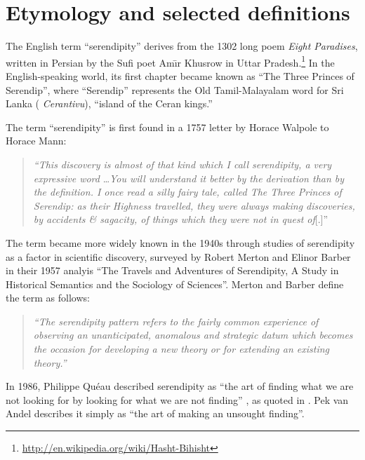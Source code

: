 
\section{Etymology and selected definitions} \label{sec:overview-serendipity}  \label{sec:literature-review}
The English term ``serendipity'' derives from the 1302 long poem \emph{Eight Paradises}, written in Persian by the Sufi poet Am\={\i}r Khusrow in Uttar Pradesh.\footnote{\url{http://en.wikipedia.org/wiki/Hasht-Bihisht}}  In the English-speaking world, its first chapter became known as ``The Three Princes of Serendip'', where ``Serendip'' represents the Old Tamil-Malayalam word for Sri Lanka (%
\emph{Cerantivu}), ``island of the Ceran kings.''

The term ``serendipity'' is first found in a 1757 letter by Horace Walpole to Horace Mann:
\begin{quote}
\emph{``This discovery is almost of that kind which I call serendipity, a very expressive
word} \ldots \emph{You will understand it better by the derivation than by the
definition. I once read a silly fairy tale, called The Three Princes of Serendip:
as their Highness travelled, they were always making discoveries, by accidents
\& sagacity, of things which they were not in quest of}[.]''~\cite[p. 633]{van1994anatomy}
\end{quote}
The term became more widely known in the 1940s through studies of serendipity as a factor in scientific discovery, surveyed by Robert Merton and Elinor Barber \citeyear{merton} in their 1957 analyis ``The Travels and Adventures of Serendipity, A Study in Historical Semantics and the Sociology of Sciences''.  Merton and Barber define the term as follows:
\begin{quote}
\emph{``The serendipity pattern refers to the fairly common experience of observing
an unanticipated, anomalous and strategic datum which becomes the occasion
for developing a new theory or for extending an existing theory.''} \cite[p. 635]{van1994anatomy}
\end{quote}
In 1986, Philippe Qu\'eau described serendipity as ``the art of
finding what we are not looking for by looking for what we are not
finding'' \cite{eloge-de-la-simulation}, as quoted in
\cite[p. 121]{Campos2002}.  Pek van Andel
\citeyear[p. 631]{van1994anatomy} describes it simply as ``the art of
making an unsought finding''.


